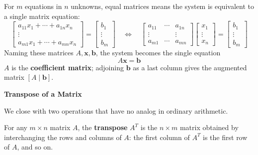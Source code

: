 \documentclass{article}
\newcommand{\redheading}[1]{{\vspace{2mm}\noindent\Large\bfseries\color{red!55!black} #1\par}\vspace{2mm}}
\theoremstyle{mystyle}
\begin{document}
For $m$ equations in $n$ unknowns, equal matrices means the system is equivalent to a single matrix equation:
\[
\begin{bmatrix}a_{11}x_1+\cdots+a_{1n}x_n\\\vdots\\a_{m1}x_1+\cdots+a_{mn}x_n\end{bmatrix}=\begin{bmatrix}b_1\\\vdots\\b_m\end{bmatrix}
\quad\Longleftrightarrow\quad
\begin{bmatrix}a_{11}&\cdots&a_{1n}\\\vdots& &\vdots\\a_{m1}&\cdots&a_{mn}\end{bmatrix}\begin{bmatrix}x_1\\\vdots\\x_n\end{bmatrix}=\begin{bmatrix}b_1\\\vdots\\b_m\end{bmatrix}
\]
Naming these matrices $A,\mathbf{x},\mathbf{b}$, the system becomes the single equation
\[
A\mathbf{x}=\mathbf{b}
\]
$A$ is the \textbf{coefficient matrix}; adjoining $\mathbf{b}$ as a last column gives the augmented matrix $[A\mid\mathbf{b}]$.

\redheading{Transpose of a Matrix}

We close with two operations that have no analog in ordinary arithmetic.

\begin{tcolorbox}[colback=teal!4, colframe=teal!65!black, title=Definition 7, fonttitle=\bfseries, boxrule=0.5mm, arc=3mm]
For any $m\times n$ matrix $A$, the \textbf{transpose} $A^T$ is the $n\times m$ matrix obtained by interchanging the rows and columns of $A$: the first column of $A^T$ is the first row of $A$, and so on.
\end{tcolorbox}
\end{document}
